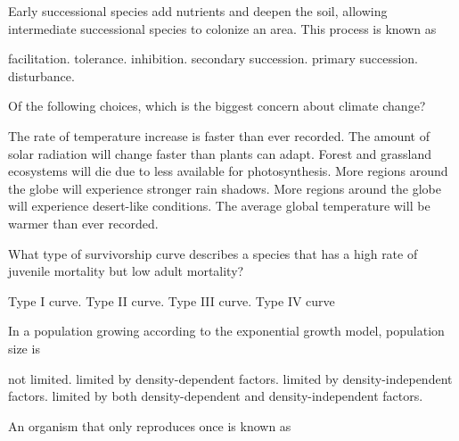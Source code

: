 \question
Early successional species add nutrients and deepen the soil, allowing intermediate successional species to colonize an area. This process is known as

\begin{choices}
\correctchoice facilitation. %
\choice tolerance. %
\choice inhibition. %
\choice secondary succession. %
\choice primary succession. %
\choice disturbance. %
\end{choices}

\question
Of the following choices, which is the biggest concern about climate change?

\begin{choices}
\correctchoice The rate of temperature increase is faster than ever recorded. %
\choice The amount of solar radiation will change faster than plants can adapt. %
\choice Forest and grassland ecosystems will die due to less  available for photosynthesis. %
\choice More regions around the globe will experience stronger rain shadows. %
\choice More regions around the globe will experience desert-like conditions. %
\choice The average global temperature will be warmer than ever recorded.  %
\end{choices}

\question
What type of survivorship curve describes a species that has a high rate of juvenile mortality but low adult mortality?

\begin{choices}
\choice Type I curve. %
\choice Type II curve. %
\correctchoice Type III curve. %
\choice Type IV curve %
\end{choices}


\question
In a population growing according to the exponential growth model, population size is

\begin{choices}
\correctchoice not limited. %
\choice limited by density-dependent factors. %
\choice limited by density-independent factors. %
\choice limited by both density-dependent and density-independent factors. %
\end{choices}


\question
An organism that only reproduces once is known as

